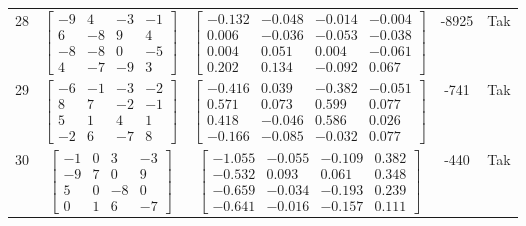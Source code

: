 \documentclass[a4paper,12pt]{article}
\begin{document}
\begin{tabular}{c c c c c}
28
&
$\begin{bmatrix} -9 & 4 & -3 & -1 \\ 6 & -8 & 9 & 4 \\ -8 & -8 & 0 & -5 \\ 4 & -7 & -9 & 3 \end{bmatrix}$
&
$\begin{bmatrix} -0.132 & -0.048 & -0.014 & -0.004 \\ 0.006 & -0.036 & -0.053 & -0.038 \\ 0.004 & 0.051 & 0.004 & -0.061 \\ 0.202 & 0.134 & -0.092 & 0.067 \end{bmatrix}$
&
-8925
&
Tak
\\
29
&
$\begin{bmatrix} -6 & -1 & -3 & -2 \\ 8 & 7 & -2 & -1 \\ 5 & 1 & 4 & 1 \\ -2 & 6 & -7 & 8 \end{bmatrix}$
&
$\begin{bmatrix} -0.416 & 0.039 & -0.382 & -0.051 \\ 0.571 & 0.073 & 0.599 & 0.077 \\ 0.418 & -0.046 & 0.586 & 0.026 \\ -0.166 & -0.085 & -0.032 & 0.077 \end{bmatrix}$
&
-741
&
Tak
\\
30
&
$\begin{bmatrix} -1 & 0 & 3 & -3 \\ -9 & 7 & 0 & 9 \\ 5 & 0 & -8 & 0 \\ 0 & 1 & 6 & -7 \end{bmatrix}$
&
$\begin{bmatrix} -1.055 & -0.055 & -0.109 & 0.382 \\ -0.532 & 0.093 & 0.061 & 0.348 \\ -0.659 & -0.034 & -0.193 & 0.239 \\ -0.641 & -0.016 & -0.157 & 0.111 \end{bmatrix}$
&
-440
&
Tak
\\
\end{tabular} \egroup \newpage
\end{document}
